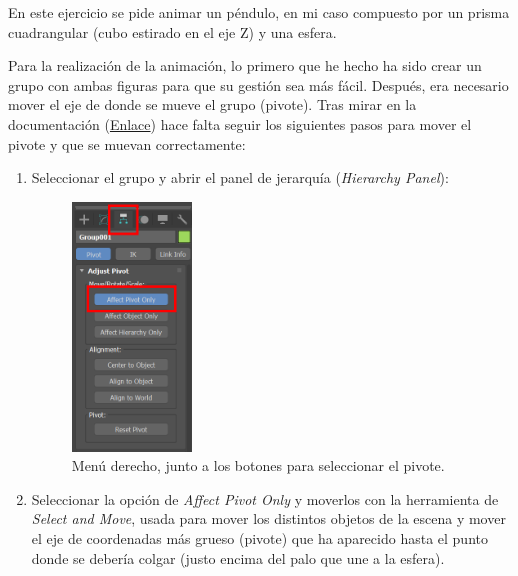 \documentclass{article}
\begin{document}
En este ejercicio se pide animar un péndulo, en mi caso compuesto por un prisma cuadrangular (cubo estirado en el eje Z) y una esfera.


Para la realización de la animación, lo primero que he hecho ha sido crear un grupo con ambas figuras para que su gestión sea más fácil. Después, era necesario mover el eje de donde se mueve el grupo (pivote). Tras mirar en la documentación (\href{https://knowledge.autodesk.com/support/3ds-max/learn-explore/caas/CloudHelp/cloudhelp/2021/ENU/3DSMax-Animation/files/GUID-6872F014-4785-43D9-A83B-C774507907B3-htm.html}{Enlace}) hace falta seguir los siguientes pasos para mover el pivote y que se muevan correctamente:

\begin{enumerate}
    \item Seleccionar el grupo y abrir el panel de jerarquía (\textit{Hierarchy Panel}):
    
	\begin{figure}[H]
	    \centering
	    \includegraphics[width=0.3\textwidth]{imagenes/Ejercicio 3/pivote_menu.png}
	    \caption{Menú derecho, junto a los botones para seleccionar el pivote.}
	\end{figure}


    \item Seleccionar la opción de \textit{Affect Pivot Only} y moverlos con la herramienta de \textit{Select and Move}, usada para mover los distintos objetos de la escena y mover el eje de coordenadas más grueso (pivote) que ha aparecido hasta el punto donde se debería colgar (justo encima del palo que une a la esfera).
    

\end{enumerate}
\end{document}

